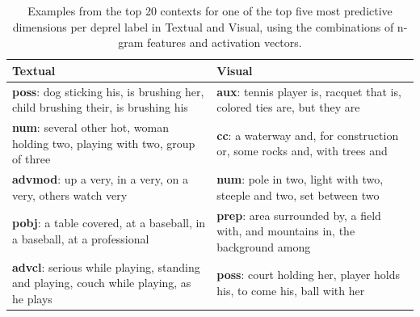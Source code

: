 \begin{table}
\small
\caption{Examples from the top 20 contexts for one of the top five most predictive dimensions 
per deprel label in {\sc Textual} and {\sc Visual}, using the combinations of n-gram features and activation vectors.}
\label{tab:syntax}
\begin{center}
    \begin{tabular}{|p{6cm}| p{6cm}|}
    \hline
    {\sc Textual} & {\sc Visual} \\
    \hline
    {\bf poss}:  dog sticking his, is brushing her, child brushing their, is brushing his &
    {\bf aux}: tennis player is, racquet that is, colored ties are, but they are\\
    \hline
    
    {\bf num}: several other hot, woman holding two, playing with two, group of three &
    {\bf cc}: a waterway and, for construction or, some rocks and, with trees and\\
    \hline

    {\bf advmod}:  up a very, in a very, on a very, others watch very &
    {\bf num}: pole in two, light with two, steeple and two, set between two\\
    \hline

   {\bf pobj}: a table covered, at a baseball, in a baseball, at a professional &
   {\bf prep}: area surrounded by, a field with, and mountains in, the background among\\   
       \hline

   {\bf advcl}: serious while playing, standing and playing, couch while playing, as 
he plays &
   {\bf poss}: court holding her, player holds his, to come his, ball with her \\
   
   \hline




\end{tabular}
\end{center}
\end{table}
